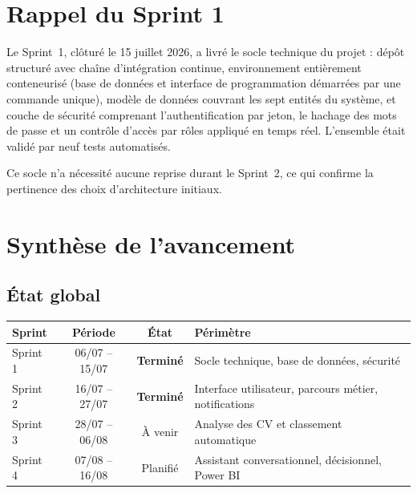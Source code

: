 \documentclass[11pt,a4paper]{article}
\begin{document}
\section{Rappel du Sprint 1}
Le Sprint~1, clôturé le 15 juillet 2026, a livré le socle technique du projet : dépôt structuré avec chaîne d'intégration continue, environnement entièrement conteneurisé (base de données et interface de programmation démarrées par une commande unique), modèle de données couvrant les sept entités du système, et couche de sécurité comprenant l'authentification par jeton, le hachage des mots de passe et un contrôle d'accès par rôles appliqué en temps réel. L'ensemble était validé par neuf tests automatisés.

Ce socle n'a nécessité aucune reprise durant le Sprint~2, ce qui confirme la pertinence des choix d'architecture initiaux.

\section{Synthèse de l'avancement}

\subsection{État global}

\begin{center}
\small
\begin{tabular}{lccp{5.4cm}}
  \toprule
  \textbf{Sprint} & \textbf{Période} & \textbf{État} & \textbf{Périmètre} \\
  \midrule
  Sprint 1 & 06/07 -- 15/07 & \textcolor{vert}{\textbf{Terminé}} & Socle technique, base de données, sécurité \\[1mm]
  Sprint 2 & 16/07 -- 27/07 & \textcolor{vert}{\textbf{Terminé}} & Interface utilisateur, parcours métier, notifications \\[1mm]
  Sprint 3 & 28/07 -- 06/08 & \textcolor{accent}{À venir} & Analyse des CV et classement automatique \\[1mm]
  Sprint 4 & 07/08 -- 16/08 & Planifié & Assistant conversationnel, décisionnel, Power BI \\
  \bottomrule
\end{tabular}
\end{center}
\end{document}
